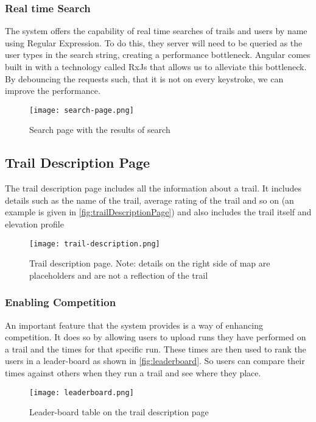 \subsubsection{Real time Search}
The system offers the capability of real time searches of trails and users by name using Regular Expression. To do this, they server will need to be queried as the user types in the search string, creating a performance bottleneck. Angular comes built in with a technology called RxJs that allows us to alleviate this bottleneck. By debouncing the requests such, that it is not on every keystroke, we can improve the performance.

\begin{figure}[htb!]
    \centering
    \texttt{[image: search-page.png]}
    \caption{Search page with the results of search}
    \label{fig:searchPage}
\end{figure}


\subsection{Trail Description Page} \label{subsec:trailDescription}
The trail description page includes all the information about a trail. It includes details such as the name of the trail, average rating of the trail and so on (an example is given in \autoref{fig:trailDescriptionPage}) and also includes the trail itself and elevation profile

\begin{figure}[htb!]
    \centering
    \texttt{[image: trail-description.png]}
    \caption{Trail description page. Note: details on the right side of map are placeholders and are not a reflection of the trail}
    \label{fig:trailDescriptionPage}
\end{figure}

\subsubsection{Enabling Competition}
An important feature that the system provides is a way of enhancing competition. It does so by allowing users to upload runs they have performed on a trail and the times for that specific run. These times are then used to rank the users in a leader-board as shown in \autoref{fig:leaderboard}. So users can compare their times against others when they run a trail and see where they place. 

\begin{figure}[htb!]
    \centering
    \texttt{[image: leaderboard.png]}
    \caption{Leader-board table on the trail description page}
    \label{fig:leaderboard}
\end{figure}

